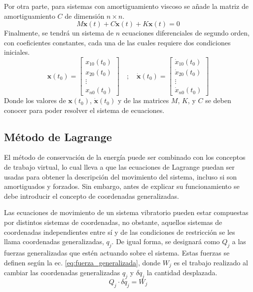 \bigskip

Por otra parte, para sistemas con amortiguamiento viscoso se añade la matriz de amortiguamiento $\mathit{C}$ de dimensión $n \times n$. 
\begin{equation}\label{eq:multi_degreedamp}
	\mathit{M}\mathbf{\ddot{x}}(t) + \mathit{C}\mathbf{\dot{x}}(t) + \mathit{K}\mathbf{x}(t) = 0	
\end{equation}
Finalmente, se tendrá un sistema de $n$ ecuaciones diferenciales de segundo orden, con coeficientes constantes, cada una de las cuales requiere dos condiciones iniciales.
\begin{equation}
	\mathbf{x}(t_0) = \begin{bmatrix}
	x_{10}(t_0)\\
	x_{20}(t_0)\\
	\vdots\\
	x_{n0}(t_0)
	\end{bmatrix} \quad ; \quad \mathbf{\dot{x}}(t_0) = \begin{bmatrix}
	\dot{x}_{10}(t_0)\\
	\dot{x}_{20}(t_0)\\
	\vdots\\
	\dot{x}_{n0}(t_0)
	\end{bmatrix}
\end{equation}
Donde los valores de $\mathbf{x}(t_0)$, $\mathbf{\dot{x}}(t_0)$ y de las matrices $\mathit{M}$, $\mathit{K}$, y $\mathit{C}$ se deben conocer para poder resolver el sistema de ecuaciones. 

\subsection{Método de Lagrange}
\label{sec:metodo_energia}
El método de conservación de la energía puede ser combinado con los conceptos de trabajo virtual, lo cual lleva a que las ecuaciones de Lagrange puedan ser usadas para obtener la descripción del movimiento del sistema, incluso si son amortiguados y forzados. Sin embargo, antes de explicar su funcionamiento se debe introducir el concepto de coordenadas generalizadas.

Las ecuaciones de movimiento de un sistema vibratorio pueden estar compuestas por distintos sistemas de coordenadas, no obstante, aquellos sistemas de coordenadas independientes entre sí y de las condiciones de restricción se les llama coordenadas generalizadas, $q_j$. De igual forma, se designará como $Q_j$ a las fuerzas generalizadas que estén actuando sobre el sistema. Estas fuerzas se definen según la ec. \ref{eq:fuerza_generalizada}, donde $W_j$ es el trabajo realizado al cambiar las coordenadas generalizadas $q_j$ y $\delta q_j$ la cantidad desplazada. 
\begin{equation}\label{eq:fuerza_generalizada}
	Q_j \cdot \delta q_j = W_j
\end{equation} 

